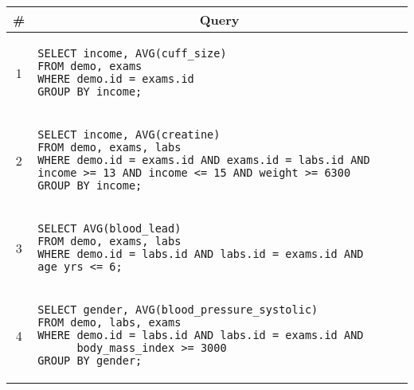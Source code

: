 \begin{tabular}{cl}
\toprule
\# & \multicolumn{1}{c}{Query} \\
\midrule
1 & 
\begin{minipage}{6in}
\begin{lstlisting}[breaklines]
SELECT income, AVG(cuff_size)
FROM demo, exams
WHERE demo.id = exams.id
GROUP BY income;
\end{lstlisting}
\end{minipage}{queryno} \label[query]{q1} \\
2 & 
\begin{minipage}{6in}
\begin{lstlisting}[breaklines]
SELECT income, AVG(creatine)
FROM demo, exams, labs
WHERE demo.id = exams.id AND exams.id = labs.id AND
income >= 13 AND income <= 15 AND weight >= 6300
GROUP BY income;
\end{lstlisting}
\end{minipage}
{queryno} \label[query]{q2} \\
3 & 
\begin{minipage}{6in}
\begin{lstlisting}[breaklines]
SELECT AVG(blood_lead)
FROM demo, exams, labs
WHERE demo.id = labs.id AND labs.id = exams.id AND age_yrs <= 6;
\end{lstlisting}
\end{minipage}{queryno} \label[query]{q3}\\
4 & 
\begin{minipage}{6in}
\begin{lstlisting}[breaklines]
SELECT gender, AVG(blood_pressure_systolic)
FROM demo, labs, exams
WHERE demo.id = labs.id AND labs.id = exams.id AND
      body_mass_index >= 3000
GROUP BY gender;
\end{lstlisting}
\end{minipage}{queryno} \label[query]{q4}\\
\bottomrule
\end{tabular}
